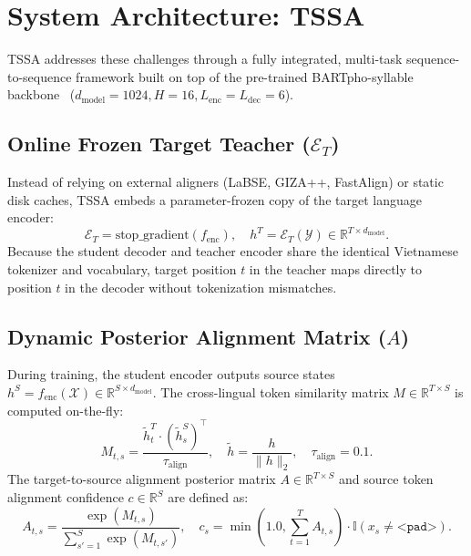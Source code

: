 \documentclass[11pt,a4paper]{article}
\begin{document}
\section{System Architecture: TSSA}
\label{sec:system_architecture}

TSSA addresses these challenges through a fully integrated, multi-task sequence-to-sequence framework built on top of the pre-trained BARTpho-syllable backbone~\cite{tran2021bartpho} ($d_{\text{model}} = 1024, H = 16, L_{\text{enc}} = L_{\text{dec}} = 6$).

\subsection{Online Frozen Target Teacher ($\mathcal{E}_T$)}
Instead of relying on external aligners (LaBSE, GIZA++, FastAlign) or static disk caches, TSSA embeds a parameter-frozen copy of the target language encoder:
\begin{equation}
    \mathcal{E}_T = \text{stop\_gradient}(f_{\text{enc}}), \quad h^T = \mathcal{E}_T(\mathcal{Y}) \in \mathbb{R}^{T \times d_{\text{model}}}.
\end{equation}
Because the student decoder and teacher encoder share the identical Vietnamese tokenizer and vocabulary, target position $t$ in the teacher maps directly to position $t$ in the decoder without tokenization mismatches.

\subsection{Dynamic Posterior Alignment Matrix ($A$)}
During training, the student encoder outputs source states $h^S = f_{\text{enc}}(\mathcal{X}) \in \mathbb{R}^{S \times d_{\text{model}}}$. The cross-lingual token similarity matrix $M \in \mathbb{R}^{T \times S}$ is computed on-the-fly:
\begin{equation}
    M_{t, s} = \frac{\tilde{h}_t^T \cdot (\tilde{h}_s^S)^\top}{\tau_{\text{align}}}, \quad \tilde{h} = \frac{h}{\|h\|_2}, \quad \tau_{\text{align}} = 0.1.
\end{equation}
The target-to-source alignment posterior matrix $A \in \mathbb{R}^{T \times S}$ and source token alignment confidence $c \in \mathbb{R}^S$ are defined as:
\begin{equation}
    A_{t, s} = \frac{\exp(M_{t, s})}{\sum_{s'=1}^S \exp(M_{t, s'})}, \quad c_s = \min\left(1.0, \sum_{t=1}^T A_{t, s}\right) \cdot \mathbb{I}(x_s \neq \texttt{<pad>}).
\end{equation}
\end{document}
